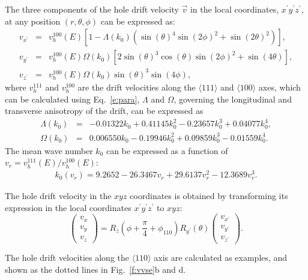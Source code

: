 \documentclass[epj,referee]{svjour}
\begin{document}
The three components of the hole drift velocity $\vec{v}$ in the local
coordinates, $x^{\prime} y^{\prime} z^{\prime}$, at any position $(r,
\theta, \phi)$ can be expressed as:
\begin{eqnarray*} 
\label{e:vsphere} 
v_{x^{\prime}} &=& v^{100}_{h}(E)
[1-\Lambda(k_{0})(\sin(\theta)^{4}\sin(2\phi)^{2} + \sin(2\theta)^{2})],\\ 
v_{y^{\prime}} &=& v^{100}_{h}(E)\Omega(k_{0})
[2\sin(\theta)^{3}\cos(\theta)\sin(2\phi)^{2} + \sin(4\theta)],\\ 
v_{z^{\prime}} &=& v^{100}_{h}(E)\Omega(k_{0})\sin(\theta)^{3}\sin(4\phi), 
\end{eqnarray*} 
where $v^{111}_{h}$ and $v^{100}_{h}$ are the drift velocities along
the $\langle 111 \rangle$ and $\langle 100 \rangle$ axes, which can be
calculated using Eq.~\ref{e:para}, $\Lambda$ and $\Omega$, governing
the longitudinal and transverse anisotropy of the drift, can be
expressed as
\begin{eqnarray*} 
\label{e:lamb} 
\Lambda(k_{0}) &=& -0.01322k_{0} + 0.41145k_{0}^{2} - 0.23657k_{0}^{3} + 0.04077k_{0}^{4},\\
\Omega(k_{0}) &=& 0.006550k_{0} - 0.19946k_{0}^{2} + 0.09859k_{0}^{3} - 0.01559k_{0}^{4}. 
\end{eqnarray*} 
The mean wave number $k_{0}$ can be expressed as a function of
$v_{r} = v^{111}_{h}(E)/v^{100}_{h}(E)$:
\begin{eqnarray*} 
\label{e:k0} 
k_{0}(v_{r}) = 9.2652 - 26.3467v_{r} + 29.6137v_{r}^{2} - 12.3689v_{r}^{3}. 
\end{eqnarray*} 
 
The hole drift velocity in the $xyz$ coordinates is obtained by
transforming its expression in the local coordinates $x^{\prime}
y^{\prime} z^{\prime}$ to $xyz$:
\begin{equation*} 
\label{e:v2v}   
\left( 
\begin{array}{c} 
v_{x} \\ v_{y} \\ v_{z} 
\end{array} 
\right) = R_{z}(\phi + \frac{\pi}{4} + \phi_{110}) R_{y^{\prime}}(\theta) \left(  
\begin{array}{c} 
v_{x^{\prime}} \\ v_{y^{\prime}} \\ v_{z^{\prime}} 
\end{array} \right).
\end{equation*}

The hole drift velocities along the $\langle 110 \rangle$ axis are
calculated as examples, and shown as the dotted lines in
Fig.~\ref{f:vvse}b and d.
\end{document}
